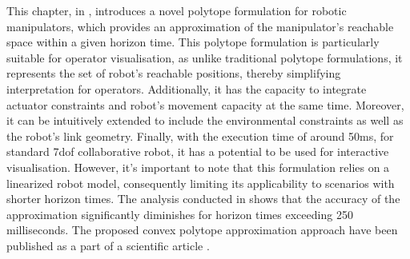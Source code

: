 
This chapter, in , introduces a novel polytope formulation for robotic manipulators, which provides an approximation of the manipulator's reachable space within a given horizon time. This polytope formulation is particularly suitable for operator visualisation, as unlike traditional polytope formulations, it represents the set of robot's reachable positions, thereby simplifying interpretation for operators. Additionally, it has the capacity to integrate actuator constraints and robot's movement capacity at the same time. Moreover, it can be intuitively extended to include the environmental constraints as well as the robot's link geometry. Finally, with the execution time of around 50ms, for standard 7dof collaborative robot, it has a potential to be used for interactive visualisation. 
However, it's important to note that this formulation relies on a linearized robot model, consequently limiting its applicability to scenarios with shorter horizon times. The analysis conducted in  shows that the accuracy of the approximation significantly diminishes for horizon times exceeding 250 milliseconds. 
The proposed convex polytope approximation approach have been published as a part of a scientific article \citet{Skuric2022hfr}.


